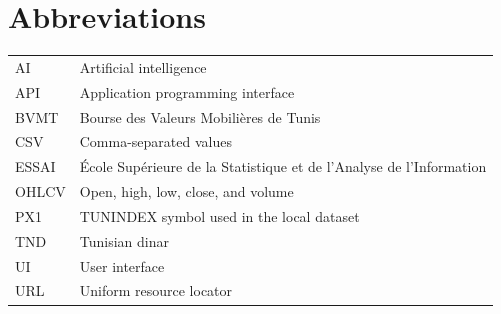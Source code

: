 \documentclass[12pt,a4paper]{report}
\begin{document}
\tableofcontents
\clearpage
\listoffigures
\clearpage
\listoftables
\clearpage

\chapter*{Abbreviations}
\begin{tabular}{p{28mm}p{105mm}}
AI & Artificial intelligence \\
API & Application programming interface \\
BVMT & Bourse des Valeurs Mobilières de Tunis \\
CSV & Comma-separated values \\
ESSAI & École Supérieure de la Statistique et de l'Analyse de l'Information \\
OHLCV & Open, high, low, close, and volume \\
PX1 & TUNINDEX symbol used in the local dataset \\
TND & Tunisian dinar \\
UI & User interface \\
URL & Uniform resource locator \\
\end{tabular}
\clearpage

\setcounter{page}{1}









\appendix

\end{document}
